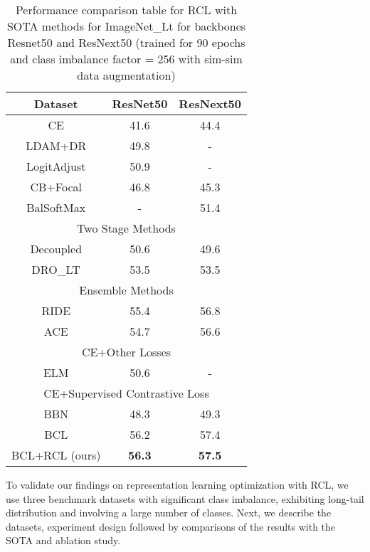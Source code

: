 \begin{table}[bt]
\caption{Performance comparison table for RCL with SOTA methods for ImageNet\_Lt for backbones Resnet50 and ResNext50 (trained for 90 epochs and class imbalance factor = 256 with sim-sim data augmentation) \vspace{2mm} }
\centering
\label{3}
\begin{tabular}{ ccc }
\hline
\textbf{Dataset}& \textbf{ResNet50}&\textbf{ResNext50} \\
\hline

CE&41.6&44.4\\

LDAM+DR  &49.8&-\\

LogitAdjust&50.9&-\\

CB+Focal&46.8&45.3\\

BalSoftMax&-&51.4\\

\hline
\multicolumn{3}{c}{Two Stage Methods}\\
\hline
Decoupled&50.6&49.6\\

DRO\_LT&53.5&53.5\\
\hline
\multicolumn{3}{c}{Ensemble Methods}\\
\hline
RIDE&55.4&56.8\\
ACE&54.7&56.6\\
\hline

\multicolumn{3}{c}{CE+Other Losses}\\
\hline
ELM&50.6&-\\
\hline
\multicolumn{3}{c}{CE+Supervised Contrastive Loss}\\
\hline
BBN&48.3&49.3\\

BCL &56.2&57.4\\
\hline

BCL+RCL (ours)&\textbf{56.3}&\textbf{57.5}\\
\hline

\end{tabular}
\label{imagenet}
\vspace{-5mm}
\end{table}

To validate our findings on representation learning optimization with RCL, we use three benchmark datasets with significant class imbalance, exhibiting long-tail distribution and involving a large number of classes. Next, we describe the datasets, experiment design followed by comparisons of the results with the SOTA and ablation study. 

